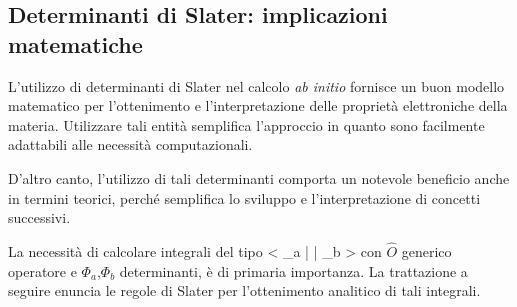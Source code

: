 \subsection{Determinanti di Slater: implicazioni matematiche}

L'utilizzo di determinanti di Slater nel calcolo \textit{ab initio} fornisce
un buon modello matematico per l'ottenimento e l'interpretazione delle
propriet\`a elettroniche della materia. Utilizzare tali entit\`a semplifica
l'approccio in quanto sono facilmente adattabili alle necessit\`a
computazionali.

D'altro canto, l'utilizzo di tali determinanti comporta un notevole
beneficio anche in termini teorici, perch\'e semplifica lo sviluppo e
l'interpretazione di concetti successivi.

La necessit\`a di calcolare integrali del tipo
\beq
\left< \Phi_a \left|  \right| \Phi_b \right>
\eeq
con $\hat{O}$ generico operatore e $\Phi_a$,$\Phi_b$ determinanti, \`e di
primaria importanza. La trattazione a seguire enuncia le regole di Slater
per l'ottenimento analitico di tali integrali.

\subsubsection{}

